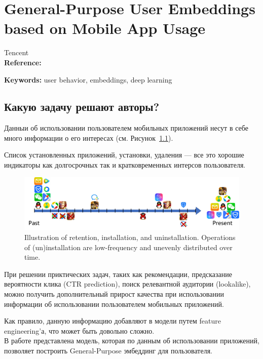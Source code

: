 \chapter{General-Purpose User Embeddings based on Mobile App Usage}

Tencent \\

\textbf{Reference:}~\cite{zhang2020general} 

\textbf{Keywords:} user behavior, embeddings, deep learning

\section*{Какую задачу решают авторы?}

Данныи об использовании пользователем мобильных приложений несут в себе много информации о его интересах (см. Рисунок~\ref{fig:behaviors}). 

Список установленных приложений, установки, удаления --- все это хорошие индикаторы как долгосрочных так и кратковременных интерсов пользователя. \\

\begin{figure}[ht]
  \centering
  \includegraphics[width=0.8\linewidth]{figures/behaviors.pdf}
  \caption{\footnotesize{Illustration of retention, installation, and uninstallation. Operations of (un)installation are low-frequency and unevenly distributed over time.}}
  \label{fig:behaviors}
\end{figure}

При решении приктических задач, таких как рекомендации, предсказание вероятности клика (CTR prediction), поиск релевантной аудитории (lookalike), можно получить дополнительный прирост качества при использовании информации об использовании пользователем мобильных приложений.

Как правило, данную информацию добавляют в модели путем feature engineering'а, что может быть довольно сложно.  \\

В работе представлена модель, которая по данным об использовании приложений, позволяет построить General-Purpose эмбеддинг для пользователя.

